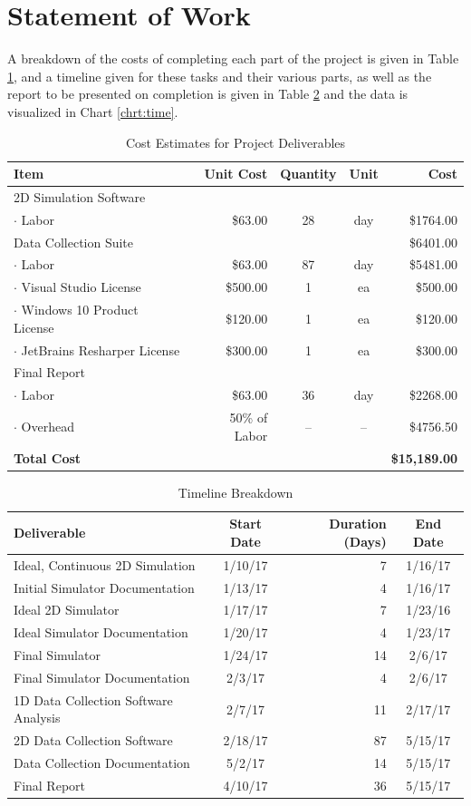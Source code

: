 \documentclass[12pt]{article}
\providecommand{\tab}{\hspace{10pt}}
\begin{document}
\section*{Statement of Work}
A breakdown of the costs of completing each part of the project
is given in Table \ref{tbl:cost}, and
a timeline given for these tasks and their various parts, as well as the
report to be presented on completion is given in Table \ref{tbl:time} and
the data is visualized in Chart \ref{chrt:time}.

\begin{table}[h]
\centering
\begin{tabular}{l|r|c|c|r}
\bf{Item} & \bf{Unit Cost} & \bf{Quantity} & \bf{Unit} & \bf{Cost}\\
\hline
2D Simulation Software & & & & \\
\tab$\cdot$ Labor & \$63.00 & 28 & day & \$1764.00\\
\hline
Data Collection Suite & & & & \$6401.00\\
\tab$\cdot$ Labor & \$63.00 & 87 & day & \$5481.00\\
\tab$\cdot$ Visual Studio License & \$500.00 & 1 & ea & \$500.00\\
\tab$\cdot$ Windows 10 Product License & \$120.00 & 1 & ea & \$120.00\\
\tab$\cdot$ JetBrains Resharper License & \$300.00 & 1 & ea & \$300.00\\
\hline
Final Report & & & & \\
\tab$\cdot$ Labor & \$63.00 & 36 & day & \$2268.00\\
\hline
\tab$\cdot$ Overhead & 50\% of Labor & -- & -- & \$4756.50\\
\hline
\bf{Total Cost} & & & & \bf{\$15,189.00}
\end{tabular}
\caption{Cost Estimates for Project Deliverables\label{tbl:cost}}
\end{table}

\begin{table}[h]
\centering
\begin{tabular}{l|c|r|c}
\bf{Deliverable} & \bf{Start Date} & \bf{Duration (Days)} & \bf{End Date}\\
\hline
Ideal, Continuous 2D Simulation & 1/10/17 & 7 & 1/16/17\\
Initial Simulator Documentation& 1/13/17 & 4 & 1/16/17\\
Ideal 2D Simulator & 1/17/17 & 7 & 1/23/16\\
Ideal Simulator Documentation & 1/20/17 & 4 & 1/23/17\\
Final Simulator & 1/24/17 & 14 & 2/6/17\\
Final Simulator Documentation & 2/3/17 & 4 & 2/6/17\\
1D Data Collection Software Analysis & 2/7/17 & 11 & 2/17/17\\
2D Data Collection Software & 2/18/17 & 87 & 5/15/17\\
Data Collection Documentation & 5/2/17 & 14 & 5/15/17\\
Final Report & 4/10/17 & 36 & 5/15/17
\end{tabular}
\caption{Timeline Breakdown\label{tbl:time}}
\end{table}
\end{document}
